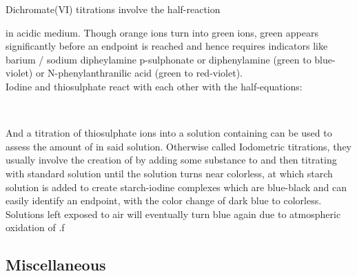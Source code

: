 \documentclass[../main]{subfiles}
\begin{document}
	Dichromate(VI) titrations involve the half-reaction 
	\begin{center}  \end{center}
	in acidic medium. Though orange  ions turn into green  ions, green appears significantly before an endpoint is reached and hence requires indicators like barium / sodium dipheylamine p-sulphonate or diphenylamine (green to blue-violet) or N-phenylanthranilic acid (green to red-violet). \\

	Iodine and thiosulphate react with each other with the half-equations:

	\begin{center}
		 \\
	\end{center} 

	And a titration of thiosulphate ions into a solution containing  can be used to assess the amount of  in said solution. Otherwise called Iodometric titrations, they usually involve the creation of  by adding some substance to  and then titrating with standard  solution until the solution turns near colorless, at which starch solution is added to create starch-iodine complexes which are blue-black and can easily identify an endpoint, with the color change of dark blue to colorless. Solutions left exposed to air will eventually turn blue again due to atmospheric oxidation of .f

	\subsection{Miscellaneous}

\end{document}
